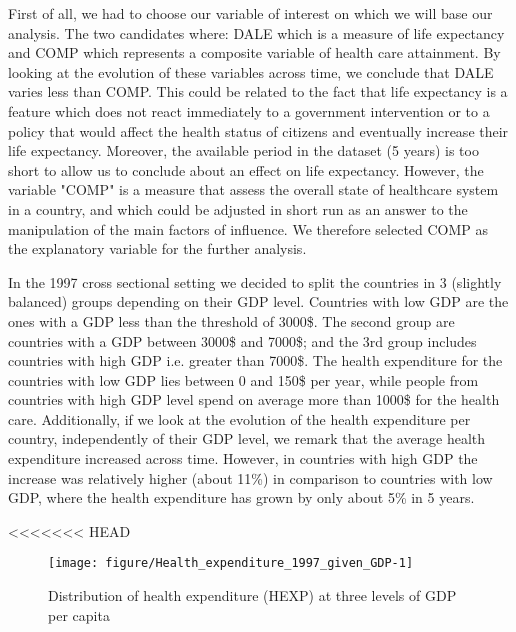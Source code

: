 \documentclass[12pt,a4paper]{article}\usepackage[]{graphicx}\usepackage[]{color}
\begin{document}
First of all, we had to choose our variable of interest on which we will base our analysis.  The two candidates where: DALE which is a measure of life expectancy and COMP which represents a composite variable of health care attainment. By looking at the evolution of these variables across time, we conclude that DALE varies less than COMP. This could be related to the fact that life expectancy is a feature which does not react immediately to a government intervention or to a policy that would affect the health status of citizens and eventually increase their life expectancy. Moreover, the available period in the dataset (5 years) is too short to allow us to conclude about an effect on life expectancy. However, the variable "COMP" is a measure that assess the overall state of healthcare system in a country, and which could be adjusted in  short run as an answer to the manipulation of the main factors of influence. We therefore selected  COMP as the explanatory variable for the further analysis.

\break
In the 1997 cross sectional setting we decided to split the countries in 3 (slightly balanced) groups depending on their GDP level. Countries with low GDP are the ones with a GDP less than the threshold of 3000\$. The second group are  countries with a GDP between 3000\$ and 7000\$; and the 3rd group includes  countries with high GDP i.e. greater than 7000\$.  
The health expenditure for the countries with low GDP lies between 0 and 150\$ per year, while people from countries with  high GDP level spend on average more than 1000\$ for the health care.  Additionally, if we look at the evolution of the health expenditure per country, independently of their GDP level, we remark that the average health expenditure increased across time. However, in countries with high GDP the increase was relatively higher (about 11\%) in comparison to countries with low GDP,  where the health expenditure has grown by only about 5\% in 5 years.


<<<<<<< HEAD
\begin{figure}[!htbp]

{\centering \texttt{[image: figure/Health\_expenditure\_1997\_given\_GDP-1]} 

}

\caption[Distribution of health expenditure (HEXP) at three levels of GDP per capita]{Distribution of health expenditure (HEXP) at three levels of GDP per capita}\label{fig:Health expenditure 1997 given GDP}
\end{figure}
\end{document}
